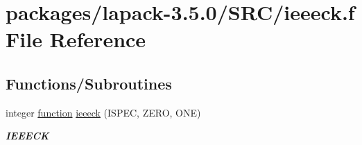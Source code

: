 \hypertarget{ieeeck_8f}{}\section{packages/lapack-\/3.5.0/\+S\+R\+C/ieeeck.f File Reference}
\label{ieeeck_8f}
\subsection*{Functions/\+Subroutines}
\begin{DoxyCompactItemize}
\item 
integer \hyperlink{afunc_8m_a7b5e596df91eadea6c537c0825e894a7}{function} \hyperlink{group__auxOTHERauxiliary_ga97715c995b884378afbbff7915d884c5}{ieeeck} (I\+S\+P\+E\+C, Z\+E\+R\+O, O\+N\+E)
\begin{DoxyCompactList}\small\item\em {\bfseries I\+E\+E\+E\+C\+K} \end{DoxyCompactList}\end{DoxyCompactItemize}
